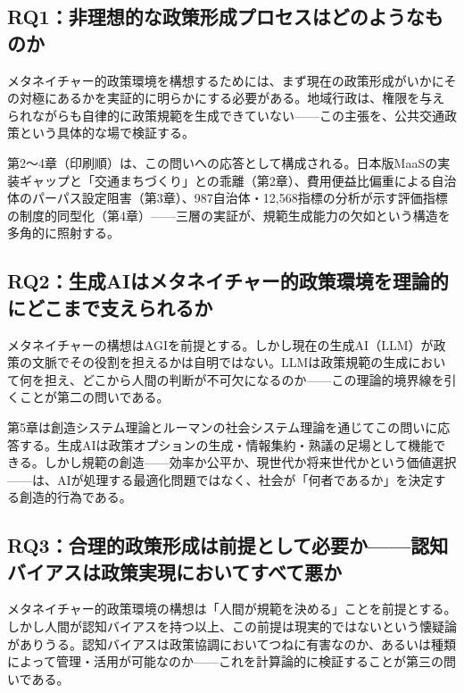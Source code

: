 \subsection{RQ1：非理想的な政策形成プロセスはどのようなものか}
\label{subsec:rq1}

メタネイチャー的政策環境を構想するためには、まず現在の政策形成がいかにその対極にあるかを実証的に明らかにする必要がある。地域行政は、権限を与えられながらも自律的に政策規範を生成できていない——この主張を、公共交通政策という具体的な場で検証する。

第2〜4章（印刷順）は、この問いへの応答として構成される。日本版MaaSの実装ギャップと「交通まちづくり」との乖離（第2章）、費用便益比偏重による自治体のパーパス設定阻害（第3章）、987自治体・12,568指標の分析が示す評価指標の制度的同型化（第4章）——三層の実証が、規範生成能力の欠如という構造を多角的に照射する。

\subsection{RQ2：生成AIはメタネイチャー的政策環境を理論的にどこまで支えられるか}
\label{subsec:rq2}

メタネイチャーの構想はAGIを前提とする。しかし現在の生成AI（LLM）が政策の文脈でその役割を担えるかは自明ではない。LLMは政策規範の生成において何を担え、どこから人間の判断が不可欠になるのか——この理論的境界線を引くことが第二の問いである。

第5章は創造システム理論とルーマンの社会システム理論を通じてこの問いに応答する。生成AIは政策オプションの生成・情報集約・熟議の足場として機能できる。しかし規範の創造——効率か公平か、現世代か将来世代かという価値選択——は、AIが処理する最適化問題ではなく、社会が「何者であるか」を決定する創造的行為である。

\subsection{RQ3：合理的政策形成は前提として必要か——認知バイアスは政策実現においてすべて悪か}
\label{subsec:rq3}

メタネイチャー的政策環境の構想は「人間が規範を決める」ことを前提とする。しかし人間が認知バイアスを持つ以上、この前提は現実的ではないという懐疑論がありうる。認知バイアスは政策協調においてつねに有害なのか、あるいは種類によって管理・活用が可能なのか——これを計算論的に検証することが第三の問いである。

